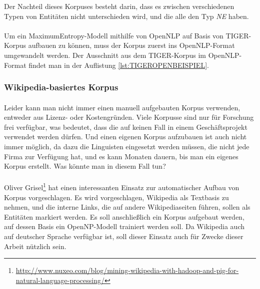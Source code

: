 Der Nachteil dieses Korpuses besteht darin, dass es zwischen verschiedenen Typen von Entitäten nicht unterschieden wird, und die alle den Typ \textit{NE} haben.

\paragraph{}
Um ein MaximumEntropy-Modell mithilfe von OpenNLP auf Basis von TIGER-Korpus aufbauen zu können, muss der Korpus zuerst ins OpenNLP-Format umgewandelt werden. Der Ausschnitt aus dem TIGER-Korpus im OpenNLP-Format findet man in der Auflistung \ref{lst:TIGEROPENBEISPIEL}.



\subsubsection{Wikipedia-basiertes Korpus}
\paragraph{}
Leider kann man nicht immer einen manuell aufgebauten Korpus verwenden, entweder aus Lizenz- oder Kostengründen. Viele Korpusse sind nur für Forschung frei verfügbar, was bedeutet, dass 
die auf keinen Fall in einem Geschäftsprojekt verwendet werden dürfen. Und einen eigenen Korpus aufzubauen ist auch nicht immer möglich, da dazu die Linguisten eingesetzt werden müssen, die nicht jede Firma zur Verfügung hat, und es kann Monaten dauern, bis man ein eigenes Korpus erstellt. Was könnte man in diesem Fall tun?

\paragraph{}
Oliver Grisel\footnote{\url{http://www.nuxeo.com/blog/mining-wikipedia-with-hadoop-and-pig-for-natural-language-processing/}} hat einen interessanten Einsatz zur automatischer Aufbau von Korpus vorgeschlagen. Es wird vorgeschlagen, Wikipedia als Textbasis zu nehmen, und die interne Links, die auf andere Wikipediaseiten führen, sollen als  Entitäten markiert werden. Es soll anschließlich ein Korpus aufgebaut werden, auf dessen Basis ein OpenNP-Modell trainiert werden soll. Da Wikipedia auch auf deutscher Sprache verfügbar ist, soll dieser Einsatz auch für Zwecke dieser Arbeit nützlich sein.

